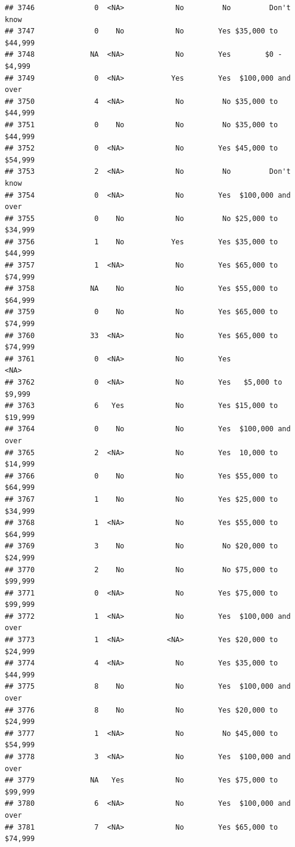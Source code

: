 \documentclass[man]{apa6}
\begin{document}
\begin{verbatim}
## 3746              0  <NA>            No         No         Don't know
## 3747              0    No            No        Yes $35,000 to $44,999
## 3748             NA  <NA>            No        Yes        $0 - $4,999
## 3749              0  <NA>           Yes        Yes  $100,000 and over
## 3750              4  <NA>            No         No $35,000 to $44,999
## 3751              0    No            No         No $35,000 to $44,999
## 3752              0  <NA>            No        Yes $45,000 to $54,999
## 3753              2  <NA>            No         No         Don't know
## 3754              0  <NA>            No        Yes  $100,000 and over
## 3755              0    No            No         No $25,000 to $34,999
## 3756              1    No           Yes        Yes $35,000 to $44,999
## 3757              1  <NA>            No        Yes $65,000 to $74,999
## 3758             NA    No            No        Yes $55,000 to $64,999
## 3759              0    No            No        Yes $65,000 to $74,999
## 3760             33  <NA>            No        Yes $65,000 to $74,999
## 3761              0  <NA>            No        Yes               <NA>
## 3762              0  <NA>            No        Yes   $5,000 to $9,999
## 3763              6   Yes            No        Yes $15,000 to $19,999
## 3764              0    No            No        Yes  $100,000 and over
## 3765              2  <NA>            No        Yes  10,000 to $14,999
## 3766              0    No            No        Yes $55,000 to $64,999
## 3767              1    No            No        Yes $25,000 to $34,999
## 3768              1  <NA>            No        Yes $55,000 to $64,999
## 3769              3    No            No         No $20,000 to $24,999
## 3770              2    No            No         No $75,000 to $99,999
## 3771              0  <NA>            No        Yes $75,000 to $99,999
## 3772              1  <NA>            No        Yes  $100,000 and over
## 3773              1  <NA>          <NA>        Yes $20,000 to $24,999
## 3774              4  <NA>            No        Yes $35,000 to $44,999
## 3775              8    No            No        Yes  $100,000 and over
## 3776              8    No            No        Yes $20,000 to $24,999
## 3777              1  <NA>            No         No $45,000 to $54,999
## 3778              3  <NA>            No        Yes  $100,000 and over
## 3779             NA   Yes            No        Yes $75,000 to $99,999
## 3780              6  <NA>            No        Yes  $100,000 and over
## 3781              7  <NA>            No        Yes $65,000 to $74,999

\end{verbatim}
\end{document}
